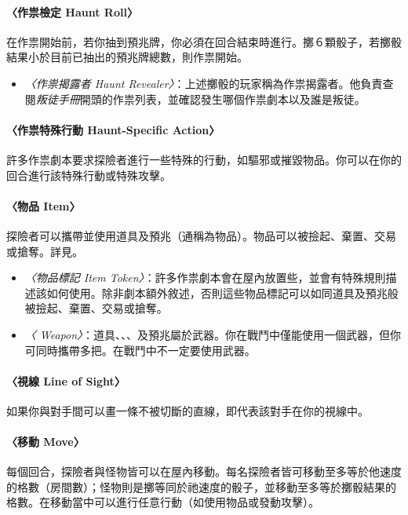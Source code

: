 \paragraph{〈作祟檢定 Haunt Roll〉}
在作祟開始前，若你抽到預兆牌，你必須在回合結束時進行。擲６顆骰子，若擲骰結果小於目前已抽出的預兆牌總數，則作祟開始。

\begin{itemize}
  \item \textit{〈作祟揭露者 Haunt Revealer〉}：上述擲骰的玩家稱為作祟揭露者。他負責查閱\emph{叛徒手冊}開頭的作祟列表，並確認發生哪個作祟劇本以及誰是叛徒。
\end{itemize}

\paragraph{〈作祟特殊行動 Haunt-Specific Action〉}
許多作祟劇本要求探險者進行一些特殊的行動，如驅邪或摧毀物品。你可以在你的回合進行該特殊行動或特殊攻擊。

\paragraph{〈物品 Item〉} \label{glossary:item}
探險者可以攜帶並使用道具及預兆（通稱為物品）。物品可以被撿起、棄置、交易或搶奪。詳見。

\begin{itemize}
  \item \textit{〈物品標記 Item Token〉}：許多作祟劇本會在屋內放置些，並會有特殊規則描述該如何使用。除非劇本額外敘述，否則這些物品標記可以如同道具及預兆般被撿起、棄置、交易或搶奪。
  \item \textit{〈 Weapon〉}：道具、、、及預兆屬於武器。你在戰鬥中僅能使用一個武器，但你可同時攜帶多把。在戰鬥中不一定要使用武器。
\end{itemize}

\paragraph{〈視線 Line of Sight〉} \label{glossary:line-of-sight}
如果你與對手間可以畫一條不被切斷的直線，即代表該對手在你的視線中。

\paragraph{〈移動 Move〉}
每個回合，探險者與怪物皆可以在屋內移動。每名探險者皆可移動至多等於他速度的格數（房間數）；怪物則是擲等同於祂速度的骰子，並移動至多等於擲骰結果的格數。在移動當中可以進行任意行動（如使用物品或發動攻擊）。

